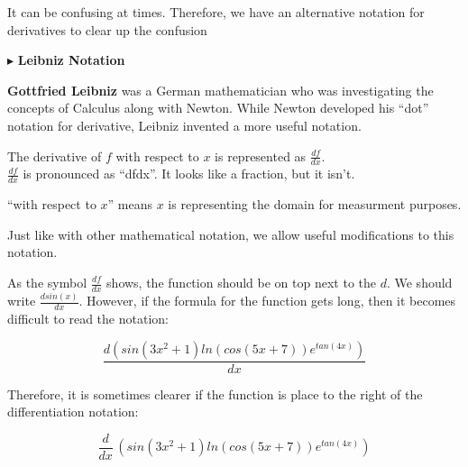 \documentclass{ximera}
\begin{document}
It can be confusing at times.  Therefore, we have an alternative notation for derivatives to clear up the confusion



$\blacktriangleright$  \textbf{\textcolor{purple!85!blue}{Leibniz Notation}}


\textbf{Gottfried Leibniz} was a German mathematician who was investigating the concepts of Calculus along with Newton.  While Newton developed his ``dot'' notation for derivative, Leibniz invented a more useful notation.


The derivative of $f$ with respect to $x$ is represented as $\frac{df}{dx}$. \\

$\frac{df}{dx}$ is pronounced as ``dfdx''.  It looks like a fraction, but it isn't.


``with respect to $x$'' means $x$ is representing the domain for measurment purposes. 



\begin{notation}


Just like with other mathematical notation, we allow useful modifications to this notation.



As the symbol $\frac{df}{dx}$ shows, the function should be on top next to the $d$.    We should write $\frac{d sin(x)}{dx}$.  However, if the formula for the function gets long, then it becomes difficult to read the notation:

\[
\frac{d (sin(3x^2+1)ln(cos(5x+7))e^{tan(4x)})}{dx}
\]


Therefore, it is sometimes clearer if the function is place to the right of the differentiation notation:




\[
\frac{d}{dx} \, (sin(3x^2+1)ln(cos(5x+7))e^{tan(4x)})
\]






\end{notation}
\end{document}
